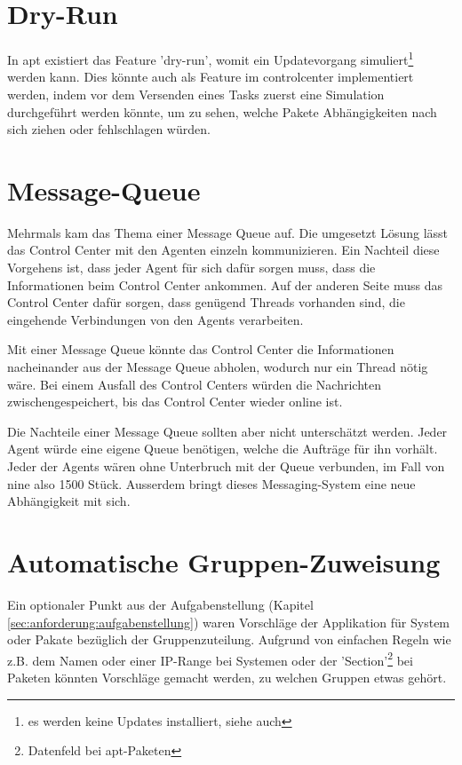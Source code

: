 \section{Dry-Run}

In \gls{apt} existiert das Feature 'dry-run', womit ein Updatevorgang simuliert\footnote{es werden keine Updates installiert, siehe auch } werden kann. Dies könnte auch als Feature im \gls{controlcenter} implementiert werden, indem vor dem Versenden eines Tasks zuerst eine Simulation durchgeführt werden könnte, um zu sehen, welche Pakete Abhängigkeiten nach sich ziehen oder fehlschlagen würden.

\section{Message-Queue}
\label{sec:ausblick:message_queue}

Mehrmals kam das Thema einer Message Queue auf. Die umgesetzt Lösung lässt das Control Center mit den Agenten einzeln kommunizieren. Ein Nachteil diese Vorgehens ist, dass jeder Agent für sich dafür sorgen muss, dass die Informationen beim Control Center ankommen. Auf der anderen Seite muss das Control Center dafür sorgen, dass genügend Threads vorhanden sind, die eingehende Verbindungen von den Agents verarbeiten.

Mit einer Message Queue könnte das Control Center die Informationen nacheinander aus der Message Queue abholen, wodurch nur ein Thread nötig wäre. Bei einem Ausfall des Control Centers würden die Nachrichten zwischengespeichert, bis das Control Center wieder online ist.

Die Nachteile einer Message Queue sollten aber nicht unterschätzt werden. Jeder Agent würde eine eigene Queue benötigen, welche die Aufträge für ihn vorhält. Jeder der Agents wären ohne Unterbruch mit der Queue verbunden, im Fall von \gls{nine} also 1500 Stück. Ausserdem bringt dieses Messaging-System eine neue Abhängigkeit mit sich. 

\section{Automatische Gruppen-Zuweisung}
\label{sec:ausblick:auto_group_assignment}

Ein optionaler Punkt aus der Aufgabenstellung (Kapitel \ref{sec:anforderung:aufgabenstellung}) waren Vorschläge der Applikation für System oder Pakate bezüglich der Gruppenzuteilung. Aufgrund von einfachen Regeln wie z.B. dem Namen oder einer IP-Range bei Systemen oder der 'Section'\footnote{Datenfeld bei apt-Paketen} bei Paketen könnten Vorschläge gemacht werden, zu welchen Gruppen etwas gehört.

